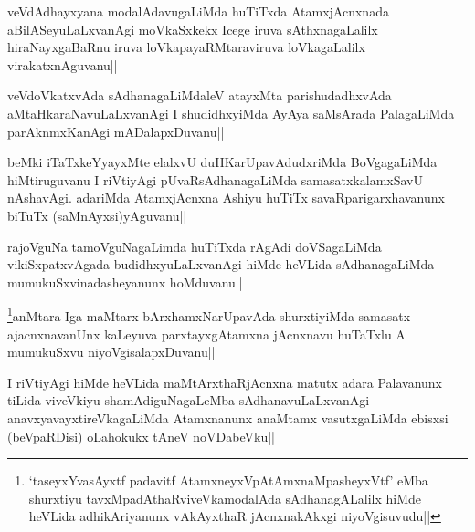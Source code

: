 \begin{artha}
veVdAdhayxyana modalAdavugaLiMda huTiTxda AtamxjAcnxnada aBilASeyuLaLxvanAgi moVkaSxkekx Icege iruva sAthxnagaLalilx hiraNayxgaBaRnu iruva loVkapayaRMtaraviruva loVkagaLalilx virakatxnAguvanu||
\end{artha}


\begin{artha}
veVdoVkatxvAda sAdhanagaLiMdaleV atayxMta parishudadhxvAda aMtaHkaraNavuLaLxvanAgi I shudidhxyiMda AyAya saMsArada PalagaLiMda parAknmxKanAgi mADalapxDuvanu||
\end{artha}


\begin{artha}
beMki iTaTxkeYyayxMte elalxvU duHKarUpavAdudxriMda BoVgagaLiMda hiMtiruguvanu I riVtiyAgi pUvaRsAdhanagaLiMda samasatxkalamxSavU nAshavAgi. adariMda AtamxjAcnxna Ashiyu huTiTx savaRparigarxhavanunx biTuTx (saMnAyxsi)yAguvanu||
\end{artha}


\begin{artha}
rajoVguNa tamoVguNagaLimda huTiTxda rAgAdi doVSagaLiMda vikiSxpatxvAgada budidhxyuLaLxvanAgi hiMde heVLida sAdhanagaLiMda mumukuSxvinadasheyanunx hoMduvanu||
\end{artha}


\begin{artha}
\footnote{`taseyxYvasAyxtf padavitf AtamxneyxVpA\s\s tAmxnaMpasheyxVtf' eMba shurxtiyu tavxMpadAthaRviveVkamodalAda sAdhanagALalilx hiMde heVLida adhikAriyanunx vAkAyxthaR jAcnxnakAkxgi niyoVgisuvudu||}anMtara Iga maMtarx bArxhamxNarUpavAda shurxtiyiMda samasatx ajacnxnavanUnx kaLeyuva parxtayxgAtamxna jAcnxnavu huTaTxlu A mumukuSxvu niyoVgisalapxDuvanu||
\end{artha}


\begin{artha}
I riVtiyAgi hiMde heVLida maMtArxthaRjAcnxna matutx adara Palavanunx tiLida viveVkiyu shamAdiguNagaLeMba sAdhanavuLaLxvanAgi anavxyavayxtireVkagaLiMda Atamxnanunx anaMtamx vasutxgaLiMda ebisxsi (beVpaRDisi) oLahokukx tAneV noVDabeVku||
\end{artha}

